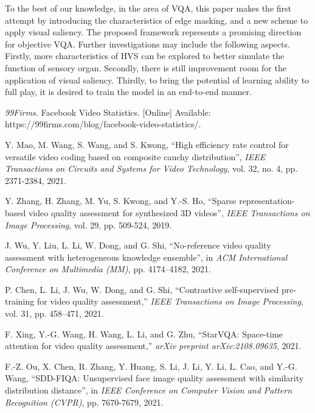 \documentclass[journal]{IEEEtran}
\begin{document}
To the best of our knowledge, in the area of VQA, this paper makes the first attempt by introducing the characteristics of edge masking, and a new scheme to apply visual saliency.
The proposed framework represents a promising direction for objective VQA. Further investigations may include the following aspects.
Firstly, more characteristics of HVS can be explored to better simulate the function of sensory organ.
Secondly, there is still improvement room for the application of visual saliency.
Thirdly, to bring the potential of learning ability to full play, it is desired to train the model in an end-to-end manner.
\begin{thebibliography}{5}
 \small 





\emph{99Firms.} Facebook Video Statistics. [Online] Available: https://99firms.com/blog/facebook-video-statistics/.

Y. Mao, M. Wang, S. Wang, and S. Kwong, ``High efficiency rate control for versatile video coding based on composite cauchy distribution'', \emph{IEEE Transactions on Circuits and Systems for Video Technology}, vol. 32, no. 4, pp. 2371-2384, 2021.

Y. Zhang, H. Zhang, M. Yu, S. Kwong, and Y.-S. Ho, ``Sparse representation-based video quality assessment for synthesized 3D videos'', \emph{IEEE Transactions on Image Processing}, vol. 29, pp. 509-524, 2019.

J. Wu, Y. Liu, L. Li, W. Dong, and G. Shi, ``No-reference video quality assessment with heterogeneous knowledge ensemble'', in \emph{ACM International Conference on Multimedia (MM),} pp. 4174–4182, 2021.

P. Chen, L. Li, J. Wu, W. Dong, and G. Shi, ``Contrastive self-supervised pre-training for video quality assessment,'' \emph{IEEE Transactions on Image Processing}, vol. 31, pp. 458–471, 2021.

F. Xing, Y.-G. Wang, H. Wang, L. Li, and G. Zhu, ``StarVQA: Space-time attention for video quality assessment,'' \emph{arXiv preprint arXiv:2108.09635}, 2021.

F.-Z. Ou, X. Chen, R. Zhang, Y. Huang, S. Li, J. Li, Y. Li, L. Cao, and Y.-G. Wang, ``SDD-FIQA: Unsupervised face image quality assessment with similarity distribution distance'', in \emph{IEEE Conference on Computer Vision and Pattern Recognition (CVPR)}, pp. 7670-7679, 2021.


\end{thebibliography}
\end{document}
